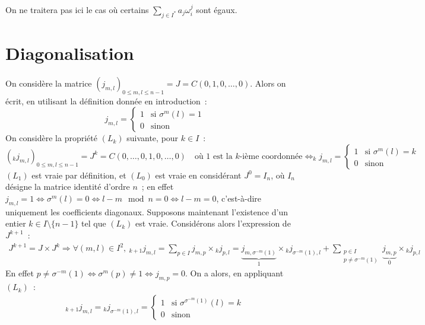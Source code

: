 \documentclass{article}
\begin{document}
  \begin{flushright}
    \small On ne traitera pas ici le cas où certains $\sum_{j\in I^*} a_j \omega_i^j$ sont égaux.
  \end{flushright}

  \section*{Diagonalisation}

  \paragraph{} On considère la matrice $(j_{m, l})_{0 \leq m, l \leq n-1} = J = C(0, 1, 0, \dots, 0)$. Alors on écrit, en utilisant la définition donnée en introduction~:
  \[
    j_{m, l} = \begin{cases}
      1 &\text{si } \sigma^m(l) = 1 \\
      0 &\text{sinon}
    \end{cases}
  \]
  On considère la propriété $(L_k)$ suivante, pour $k\in I$~:
  \[
    (_k j_{m, l})_{0 \leq m, l \leq n-1} = J^k = C(0, \dots, 0, 1, 0, \dots, 0) \quad\text{où 1 est la $k$-ième coordonnée} \iff _kj_{m, l} = \begin{cases}
      1 &\text{si } \sigma^m(l) = k \\
      0 &\text{sinon}
    \end{cases}
  \]
  $(L_1)$ est vraie par définition, et $(L_0)$ est vraie en considérant $J^0 = I_n$, où $I_n$ désigne la matrice identité d'ordre $n$~; en effet $j_{m, l} = 1 \iff \sigma^m(l) = 0 \iff l - m \mod n = 0 \iff l - m = 0$, c'est-à-dire uniquement les coefficients diagonaux. Supposons maintenant l'existence d'un entier $k\in I\setminus\{n-1\}$ tel que $(L_k)$ est vraie. Considérons alors l'expression de $J^{k+1}$~:
  \begin{align*}
     J^{k+1} = J \times J^k \Longrightarrow \forall (m, l)\in I^2,\:
     _{k+1}j_{m, l} = \sum_{p\in I} j_{m, p} \times {}_k j_{p, l} = \underbrace{j_{m, \sigma^{-m}(1)}}_{1} \times {}_kj_{\sigma^{-m}(1), l} + \sum_{\substack{p\in I \\ p \neq \sigma^{-m}(1)}} \underbrace{j_{m, p}}_{0} \times {}_k j_{p, l}
  \end{align*}
  En effet $p \neq \sigma^{-m}(1) \iff \sigma^m(p) \neq 1 \iff j_{m, p} = 0$. On a alors, en appliquant $(L_k)$~:
  \begin{align*}
    _{k+1} j_{m, l} = {}_kj_{\sigma^{-m}(1), l} = \begin{cases}
      1 &\text{si } \sigma^{\sigma^{-m}(1)}(l) = k \\
      0 &\text{sinon}
    \end{cases}
  \end{align*}
\end{document}
